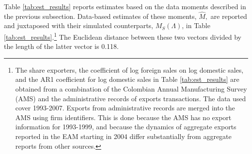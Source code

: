 Table \ref{tab:est_results} reports estimates based on the data moments described in the
previous subsection. Data-based estimates of these moments, $\widehat{M},$
are reported and juxtaposed with their simulated counterparts, $%
M_{S}(\Lambda )$, in Table \ref{tab:est_results}.\footnote{%
The share exporters, the coefficient of log foreign sales on log domestic
sales, and the AR1 coefficient for log domestic sales in Table \ref{tab:est_results} are
obtained from a combination of the Colombian Annual Manufacturing Survey
(AMS) and the administrative records of exports transactions. The data used
cover 1993-2007. Exports from administrative records are merged into the AMS
using firm identifiers. This is done because the AMS has no export
information for 1993-1999, and because the dynamics of aggregate exports
reported in the EAM starting in 2004 differ substantially from aggregate
reports from other sources.} The Euclidean distance between these two
vectors divided by the length of the latter vector is 0.118.

